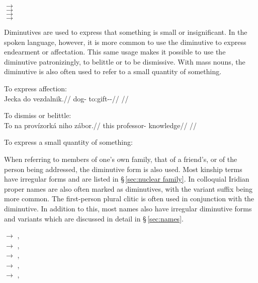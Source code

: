 \ex
{} $\rightarrow$ \\
 $\rightarrow$  \\
 $\rightarrow$  \\
 $\rightarrow$  
\xe

Diminutives are used to express that something is small or insignificant. In the spoken language, however, it is more common to use the diminutive to express endearment or affectation. This same usage makes it possible to use the diminutive patronizingly, to belittle or to be dismissive. With mass nouns, the diminutive is also often used to refer to a small quantity of something.

\pex
\a To express affection:\\
\begingl
\gla Jecka do vezdalnik.//
\glb dog-  to:gift-\Pv{}-\Pf{}//
\glft {}//
\endgl

\a To dismiss or belittle:\\
\begingl
\gla To na provízorká niho zábor.//
\glb this \Loc{} professor-  knowledge//
\glft {}//
\endgl

\a To express a small quantity of something:
\xe

When referring to members of one's own family, that of a friend's, or of the person being addressed, the diminutive form is also used. Most kinship terms have irregular forms and are listed in \S\,\ref{sec:nuclear family}. In colloquial Iridian proper names are also often marked as diminutives, with the variant suffix  being more common. The first-person plural clitic  is often used in conjunction with the diminutive. In addition to this, most names also have irregular diminutive forms and variants which are discussed in detail in \S\,\ref{sec:names}.

\ex
{} $\rightarrow$ , \\
 $\rightarrow$ , \\
 $\rightarrow$ , \\
 $\rightarrow$ , \\
 $\rightarrow$ , 
\xe

